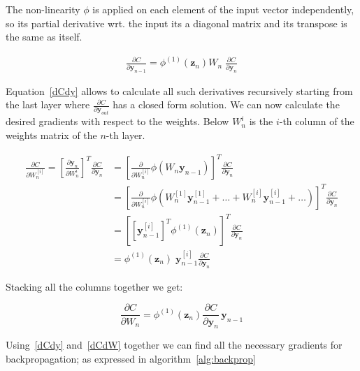 \documentclass{article}
\begin{document}
    The non-linearity $\phi$ is applied on each element of the input vector independently, so its partial derivative wrt.
    the input its a diagonal matrix and its transpose is the same as itself.

    \begin{align}
        \frac{ \partial C}{\partial \textbf{y}_{n-1} }
        =
        \phi^{(1)}( \pmb{z}_n )
        W_n \;
        \frac{ \partial C}{\partial \textbf{y}_{n} }
        \label{dCdy}
    \end{align}

    Equation~\eqref{dCdy} allows to calculate all such derivatives recursively starting from the last layer where $\frac{\partial C}{\partial \textbf{y}_{out}}$ has a closed form solution.
    We can now calculate the desired gradients with respect to the weights.
    Below $W_n^i$ is the $i$-th column of the weights matrix of the $n$-th layer.

    \begin{align*}
        \frac{ \partial C}{\partial W_n^{[i]} }
        =
        \left[ \frac{ \partial \pmb{y}_{n}}{\partial W_n^i } \right]^T
        \frac{ \partial C}{\partial \pmb{y}_{n} }
        &=
        \left[ \frac{ \partial }{\partial W_n^{[i]} }  \phi( W_{n} \bm{y}_{n-1} )  \right]^T
        \frac{ \partial C}{\partial \pmb{y}_{n} }
        \\
        &=
        \left[ \frac{ \partial }{\partial W_n^{[i]} }  \phi(  W_{n}^{[1]} \bm{y}_{n-1}^{[1]} + \dots +W_{n}^{[i]} \bm{y}_{n-1}^{[i]} + \dots )  \right]^T
        \frac{ \partial C}{\partial \pmb{y}_{n} }
        \\
        &=
        \left[ \left[ \pmb{y}_{n-1}^{[i]} \right]^T \phi^{(1)}(\pmb{z}_n )  \right]^T
        \frac{ \partial C}{\partial \pmb{y}_{n} }
        \\
        &=
        \phi^{(1)}(\pmb{z}_n ) \; \pmb{y}_{n-1}^{[i]}
        \frac{ \partial C}{\partial \pmb{y}_{n} }
    \end{align*}

    Stacking all the columns together we get:

    \begin{equation}
        \label{dCdW}
        \frac{ \partial C}{\partial W_n}
        =
        \phi^{(1)}(\pmb{z}_n )
        \frac{ \partial C}{\partial \pmb{y}_{n} }  \,
        \pmb{y}_{n-1}
    \end{equation}

    Using~\eqref{dCdy} and~\eqref{dCdW} together we can find all the necessary gradients for backpropagation; as expressed in algorithm~\ref{alg:backprop}
\end{document}
